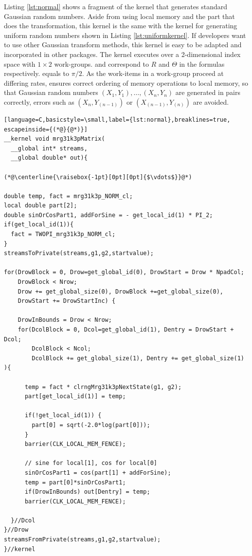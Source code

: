 \documentclass[article,nojss]{jss}\usepackage[]{graphicx}\usepackage[]{color}
\begin{document}
Listing \ref{lst:normal} shows a fragment of the kernel that generates standard Gaussian random numbers. Aside from using local memory and the part that does the transformation, this kernel is the same with the kernel for generating uniform random numbers shown in Listing \ref{lst:uniformkernel}. If developers want to use other Gaussian transform methods, this kernel is easy to be adapted and incorporated in other  packages. The kernel executes over a 2-dimensional index space with $1 \times 2$ work-groups.  and  correspond to $R$ and $\Theta$ in the formulas respectively.  equals to $\pi/2$. As the work-items in a work-group proceed at differing rates,  ensures correct ordering of memory operations to local memory, so that Gaussian random numbers $(X_1,Y_1), \dots, (X_n,Y_n)$ are generated in pairs correctly, errors such as $(X_n, Y_{(n-1)})$ or $(X_{(n-1)}, Y_{(n)})$ are avoided.
%
\begin{framed}
\begin{lstlisting}[language=C,basicstyle=\small,label={lst:normal},breaklines=true, escapeinside={(*@}{@*)}]
__kernel void mrg31k3pMatrix(
  __global int* streams,
  __global double* out){

(*@\centerline{\raisebox{-1pt}[0pt][0pt]{$\vdots$}}@*)

double temp, fact = mrg31k3p_NORM_cl;
local double part[2];
double sinOrCosPart1, addForSine = - get_local_id(1) * PI_2;
if(get_local_id(1)){
  fact = TWOPI_mrg31k3p_NORM_cl;
}
streamsToPrivate(streams,g1,g2,startvalue);

for(DrowBlock = 0, Drow=get_global_id(0), DrowStart = Drow * NpadCol;
    DrowBlock < Nrow;
    Drow += get_global_size(0), DrowBlock +=get_global_size(0), 
    DrowStart += DrowStartInc) {
    
    DrowInBounds = Drow < Nrow;
    for(DcolBlock = 0, Dcol=get_global_id(1), Dentry = DrowStart + Dcol;
        DcolBlock < Ncol;
        DcolBlock += get_global_size(1), Dentry += get_global_size(1) ){
        
      temp = fact * clrngMrg31k3pNextState(g1, g2);
      part[get_local_id(1)] = temp;
      
      if(!get_local_id(1)) {
        part[0] = sqrt(-2.0*log(part[0]));
      }
      barrier(CLK_LOCAL_MEM_FENCE);
      
      // sine for local[1], cos for local[0]
      sinOrCosPart1 = cos(part[1] + addForSine);
      temp = part[0]*sinOrCosPart1;
      if(DrowInBounds) out[Dentry] = temp;
      barrier(CLK_LOCAL_MEM_FENCE);
      
  }//Dcol
}//Drow
streamsFromPrivate(streams,g1,g2,startvalue);
}//kernel
\end{lstlisting}
\end{framed}
\end{document}
